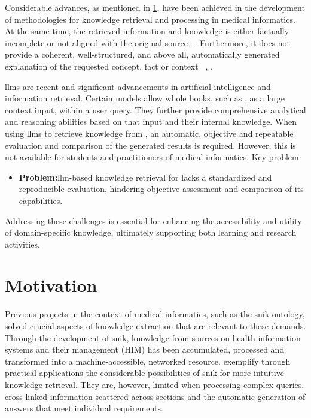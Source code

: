 %
Considerable advances, as mentioned in \cref{sec:motivation}, have been a\-chieved in the development of methodologies for knowledge retrieval and processing in medical informatics. 
%
At the same time, the retrieved information and knowledge is either factually incomplete or not aligned with the original source ~\citep[cf.]{Paul_Keller}.
Furthermore, it does not provide a coherent, well-structured, and above all, automatically generated explanation of the requested concept, fact or context ~\citep[cf.]{snikquiz}, \citep[cf.]{hannesbell}.
%

%
\acp{llm} are recent and significant advancements in artificial intelligence and information retrieval.
Certain models allow whole books, such as \citet{bb2}, as a large context input, within a user query.
They further provide comprehensive analytical and reasoning abilities based on that input and their internal knowledge.
%
When using \acp{llm} to retrieve knowledge from \citet{bb2}, an automatic, objective and repeatable evaluation and comparison of the generated results is required.
However, this is not available for students and practitioners of medical informatics.
%
Key problem:
\begin{itemize}
\item \textbf{Problem:}\ac{llm}-based knowledge retrieval for \citet{bb2} lacks a standardized and reproducible evaluation, hindering objective assessment and comparison of its capabilities.
\end{itemize}
%
%
Addressing these challenges is essential for enhancing the accessibility and utility of domain-specific knowledge, ultimately supporting both learning and research activities.
%
\section{Motivation}\label{sec:motivation}
 
Previous projects in the context of medical informatics, such as the \ac{snik} ontology, solved crucial aspects of knowledge extraction that are relevant to these demands.
Through the development of \ac{snik}, knowledge from sources on health information systems and their management (HIM) has been accumulated, processed and transformed into a machine-accessible, networked resource.
%
\citet{hannesbell, hannesbell_skill, qanswer} exemplify through practical applications the considerable possibilities of \ac{snik} for more intuitive knowledge retrieval.
They are, however, limited when processing complex queries, cross-linked information scattered across sections and the automatic generation of answers that meet individual requirements.

